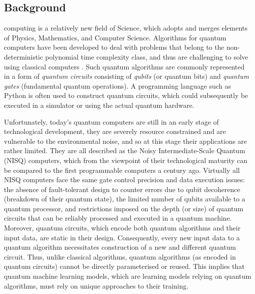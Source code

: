 \subsection{Background}\label{Sec: Background Section}
 computing is a relatively new field of Science, which adopts and merges elements of Physics, Mathematics, and Computer Science.
Algorithms for quantum computers have been developed to deal with problems that belong to the non-deterministic polynomial time complexity class, and thus are challenging to solve using classical computers \cite{williamsSolvingNPCompleteProblems2011,jiangQuantumAnnealingPrime2018,farhiQuantumApproximateOptimization2014}.
Such quantum algorithms are commonly represented in a form of \emph{quantum circuits} consisting of \emph{qubits} (or quantum bits) and \emph{quantum gates} (fundamental quantum operations). A programming language such as Python is often used to construct quantum circuits, which could subsequently be executed in a simulator or using the actual quantum hardware.


Unfortunately, today's quantum computers are still in an early stage of technological development, they are severely resource constrained and are vulnerable to the environmental noise, and so at this stage their applications are rather limited.
They are all described as the Noisy Intermediate-Scale Quantum (NISQ) \cite{brooksQuantumSupremacyHunt2019} computers, which from the viewpoint of their technological maturity can be compared to the first programmable computers a century ago.
Virtually all NISQ computers face the same gate control precision and data execution issues: the absence of fault-tolerant design to counter errors due to qubit decoherence (breakdown of their quantum state), the limited number of qubits available to a quantum processor, and restrictions imposed on the depth (or size) of quantum circuits that can be reliably processed and executed in a quantum machine.
Moreover, quantum circuits, which encode both quantum algorithms and their input data, are static in their design.
Consequently, every new input data to a quantum algorithm necessitates construction of a new and different quantum circuit.
Thus, unlike classical algorithms, quantum algorithms (as encoded in quantum circuits) cannot be directly parameterised or reused. This implies that quantum machine learning models, which are learning models relying on quantum algorithms, must rely on unique approaches to their training.

